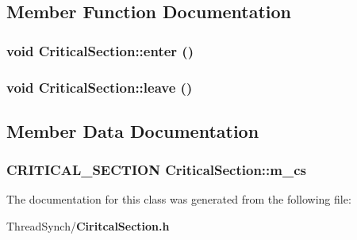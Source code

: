 \subsection{Member Function Documentation}
\subsubsection{\setlength{\rightskip}{0pt plus 5cm}void Critical\-Section::enter ()\hspace{0.3cm}{\tt  [inline]}}\label{class_critical_section_a75ef9d5c1667e290a433ba34dc23844}


\subsubsection{\setlength{\rightskip}{0pt plus 5cm}void Critical\-Section::leave ()\hspace{0.3cm}{\tt  [inline]}}\label{class_critical_section_9fc86b2c948da45d66c46496b9b11a0f}




\subsection{Member Data Documentation}
\subsubsection{\setlength{\rightskip}{0pt plus 5cm}CRITICAL\_\-SECTION {\bf Critical\-Section::m\_\-cs}\hspace{0.3cm}{\tt  [private]}}\label{class_critical_section_1409b4864bf6e32d28ba2768cb779db3}




The documentation for this class was generated from the following file:\begin{CompactItemize}
\item 
Thread\-Synch/{\bf Ciritcal\-Section.h}\end{CompactItemize}

